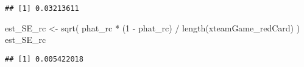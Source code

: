 \documentclass[
]{article}
\newenvironment{Shaded}{\begin{snugshade}}{\end{snugshade}}
\newcommand{\DecValTok}[1]{\textcolor[rgb]{0.00,0.00,0.81}{#1}}
\newcommand{\FunctionTok}[1]{\textcolor[rgb]{0.00,0.00,0.00}{#1}}
\newcommand{\NormalTok}[1]{#1}
\newcommand{\OtherTok}[1]{\textcolor[rgb]{0.56,0.35,0.01}{#1}}
\newcommand{\SpecialCharTok}[1]{\textcolor[rgb]{0.00,0.00,0.00}{#1}}
\begin{document}
\begin{verbatim}
## [1] 0.03213611
\end{verbatim}

\begin{Shaded}
\begin{Highlighting}[]
\NormalTok{est\_SE\_rc }\OtherTok{\textless{}{-}} \FunctionTok{sqrt}\NormalTok{( phat\_rc }\SpecialCharTok{*}\NormalTok{ (}\DecValTok{1} \SpecialCharTok{{-}}\NormalTok{ phat\_rc) }\SpecialCharTok{/} \FunctionTok{length}\NormalTok{(xteamGame\_redCard) ) }
\NormalTok{est\_SE\_rc}
\end{Highlighting}
\end{Shaded}

\begin{verbatim}
## [1] 0.005422018
\end{verbatim}
\end{document}
